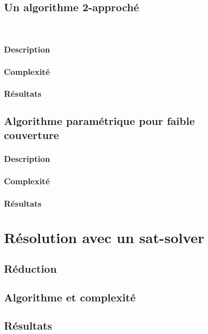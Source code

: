 \documentclass[a4paper,10pt]{article}
\begin{document}
\subsection{Un algorithme 2-approché}
\ 
\subsubsection{Description}

\subsubsection{Complexité}

\subsubsection{Résultats}


\subsection{Algorithme paramétrique pour faible couverture}

\subsubsection{Description}

\subsubsection{Complexité}

\subsubsection{Résultats}


\section{Résolution avec un sat-solver}


\subsection{Réduction}

\subsection{Algorithme et complexité}


\subsection{Résultats}
\end{document}
